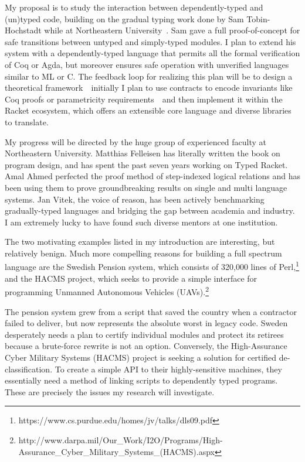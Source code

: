 \documentclass[12pt]{article}
\newcommand{\hdr}[2]{\vspace{-0.4cm}{\flushleft{\hrulefill\\\textbf{#1}\hfill{#2}\\\vspace{-0.2cm}\hrulefill}}\vspace{0.1cm}}
\begin{document}
My proposal is to study the interaction between dependently-typed and (un)typed code, building on the gradual typing work done by Sam Tobin-Hochstadt while at Northeastern University~\cite{tobin2010typed}.
Sam gave a full proof-of-concept for safe transitions between untyped and simply-typed modules.
I plan to extend his system with a dependently-typed language that permits all the formal verification of Coq or Agda, but moreover ensures safe operation with unverified languages similar to ML or C.
The feedback loop for realizing this plan will be to design a theoretical framework~\textemdash~initially I plan to use contracts to encode invariants like Coq proofs or parametricity requirements~\textemdash~and then implement it within the Racket ecosystem, which offers an extensible core language and diverse libraries to translate.

My progress will be directed by the huge group of experienced faculty at Northeastern University.
Matthias Felleisen has literally written the book on program design, and has spent the past seven years working on Typed Racket.
Amal Ahmed perfected the proof method of step-indexed logical relations and has been using them to prove groundbreaking results on single and multi language systems.
Jan Vitek, the voice of reason, has been actively benchmarking gradually-typed languages and bridging the gap between academia and industry.
I am extremely lucky to have found such diverse mentors at one institution.

\newpage

\hdr{Broader Impacts}{}

The two motivating examples listed in my introduction are interesting, but relatively benign.
Much more compelling reasons for building a full spectrum language are the Swedish Pension system, which consists of 320,000 lines of Perl,\footnote{https://www.cs.purdue.edu/homes/jv/talks/dls09.pdf} and the HACMS project, which seeks to provide a simple interface for programming Unmanned Autonomous Vehicles (UAVs).\footnote{http://www.darpa.mil/Our\_Work/I2O/Programs/High-Assurance\_Cyber\_Military\_Systems\_(HACMS).aspx}

The pension system grew from a script that saved the country when a contractor failed to deliver, but now represents the absolute worst in legacy code.
Sweden desperately needs a plan to certify individual modules and protect its retirees because a brute-force rewrite is not an option.
Conversely, the High-Assurance Cyber Military Systems (HACMS) project is seeking a solution for certified de-classification.
To create a simple API to their highly-sensitive machines, they essentially need a method of linking scripts to dependently typed programs.
These are precisely the issues my research will investigate.
\end{document}
